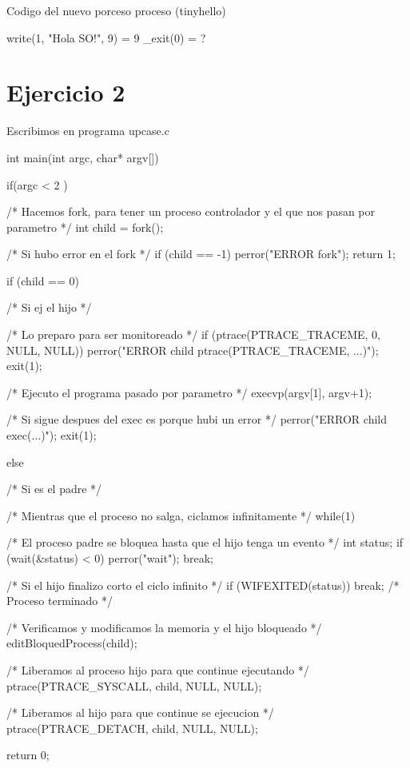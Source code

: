 Codigo del nuevo porceso proceso (tinyhello)
\begin{framed}
\begin{verbatimtab}
write(1, "Hola SO!\n", 9)   = 9
_exit(0)                    = ?
\end{verbatimtab}
\end{framed}

\newpage

\section{Ejercicio 2}

Escribimos en programa upcase.c

\begin{framed}
\begin{verbatimtab}
int main(int argc, char* argv[]) {
	
	if(argc < 2 )
	{

	}

	/* Hacemos fork, para tener un proceso controlador y el que nos pasan por parametro */
	int child = fork();
	
	/* Si hubo error en el fork */
	if (child == -1) { 
		perror("ERROR fork"); 
		return 1; 
	}
	
	if (child == 0) { /* Si ej el hijo */

		/* Lo preparo para ser monitoreado */
		if (ptrace(PTRACE_TRACEME, 0, NULL, NULL)) {
			perror("ERROR child ptrace(PTRACE_TRACEME, ...)"); exit(1);
		}
		
		/* Ejecuto el programa pasado por parametro */
		execvp(argv[1], argv+1);
		
		/* Si sigue despues del exec es porque hubi un error */
		perror("ERROR child exec(...)"); 
		exit(1);	
	
	} else { /* Si es el padre */
		
		/* Mientras que el proceso no salga, ciclamos infinitamente */
		while(1) {
			
			/* El proceso padre se bloquea hasta que el hijo tenga un evento */
			int status;
			if (wait(&status) < 0) { 
				perror("wait"); 
				break; 
			}
			
			/* Si el hijo finalizo corto el ciclo infinito */
			if (WIFEXITED(status)) 
				break; /* Proceso terminado */
			
			/* Verificamos y modificamos la memoria y el hijo bloqueado */
			editBloquedProcess(child);
			
			/* Liberamos al proceso hijo para que continue ejecutando */
			ptrace(PTRACE_SYSCALL, child, NULL, NULL);
		}
		
		/* Liberamos al hijo para que continue se ejecucion */
		ptrace(PTRACE_DETACH, child, NULL, NULL);
	}
	return 0;
}
\end{verbatimtab}
\end{framed}